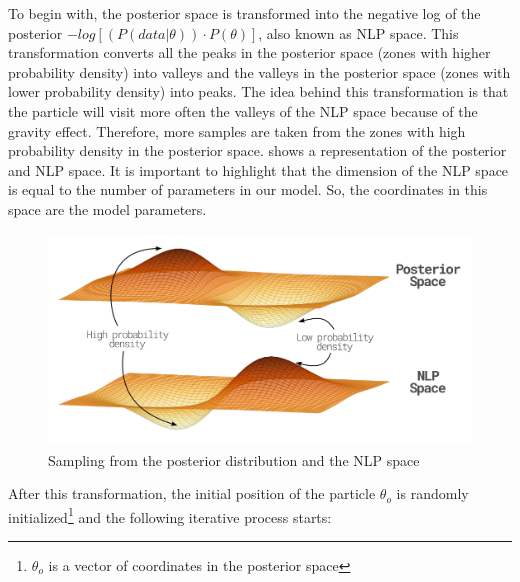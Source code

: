 To begin with, the posterior space is transformed into the negative log of the posterior $-log[(P(data|\theta))\cdot P(\theta)]$, also known as NLP space. This transformation converts all the peaks in the posterior space (zones with higher probability density) into valleys and the valleys in the posterior space (zones with lower probability density) into peaks. The idea behind this transformation is that the particle will visit more often the valleys of the NLP space because of the gravity effect. Therefore, more samples are taken from the zones with high probability density in the posterior space.  shows a representation of the posterior and NLP space. It is important to highlight that the dimension of the NLP space is equal to the number of parameters in our model. So, the coordinates in this space are the model parameters. 

\begin{figure}[H]
    \centering
    \includegraphics[width=1.0\textwidth]{images/ch3_NLP_space/nlp_space.png}
    \caption{Sampling from the posterior distribution and the NLP space }
    \label{fig:nlp_space}
\end{figure}

After this transformation, the initial position of the particle ${\theta_{o}}$ is randomly initialized\footnote{${\theta_{o}}$ is a vector of coordinates in the posterior space} and the following iterative process starts:

